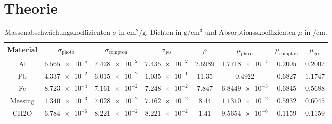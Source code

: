 \section{Theorie}
\label{sec:Theorie}

\begin{table}[htp]
	\begin{center}
    \caption{Massenabschwächungskoeffizienten $\sigma$ in $\si{\centi\meter\squared\per\gram}$, Dichten in $\si{\gram\per\centi\meter\cubed}$ und Absorptionsskoeffizienten $\mu$ in $\si{\per\centi\meter}$.}
    \label{tab:dicke}
		\begin{tabular}{cccccccc}
		\toprule
			Material & $\sigma_{\text{photo}}$ & $\sigma_{\text{compton}}$ & $\sigma_{\text{ges}}$ & $\rho$ & $\mu_{\text{photo}}$ & $\mu_{\text{compton}}$ & $\mu_{\text{ges}}$\\
			\midrule
			Al & $\num{6.565e-5}$ & $\num{7.428e-2}$ & $\num{7.435e-2}$ & $\num{2.6989}$ & $\num{1.7718e-4}$ & $\num{0.2005}$ & $\num{0.2007}$\\
      Pb & $\num{4.337e-2}$ & $\num{6.015e-2}$ & $\num{1.035e-1}$ & $\num{11.35}$ & $\num{0.4922}$ & $\num{0.6827}$ & $\num{1.1747}$\\
      Fe & $\num{8.723e-4}$ & $\num{7.161e-2}$ & $\num{7.248e-2}$ & $\num{7.847}$ & $\num{6.8449e-3}$ & $\num{0.6845}$ & $\num{0.5688}$\\
      Messing & $\num{1.340e-3}$ & $\num{7.028e-2}$ & $\num{7.162e-2}$ & $\num{8.44}$ & $\num{1.1310e-2}$ & $\num{0.5932}$ & $\num{0.6045}$\\
      CH2O & $\num{6.784e-6}$ & $\num{8.221e-2}$ & $\num{8.221e-2}$ & $\num{1.41}$ & $\num{9.5654e-6}$ & $\num{0.1159}$ & $\num{0.1159}$\\
		\bottomrule
		\end{tabular}
	\end{center}
\end{table}
